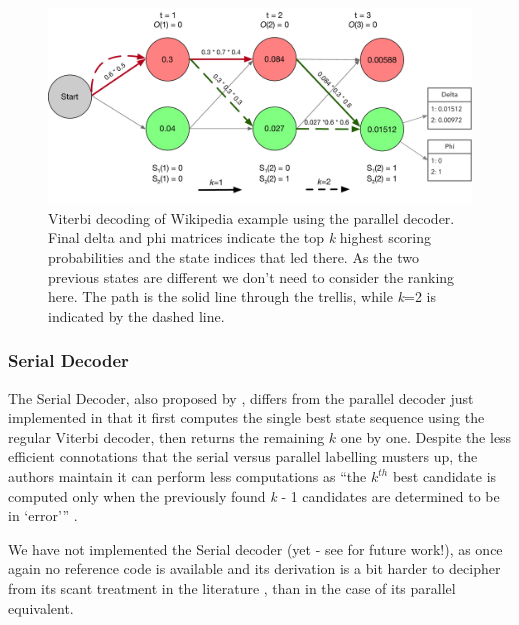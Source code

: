 {{{{{{{{\begin{figure}
	\begin{center}
		\includegraphics[width=1.0\textwidth]{ch05_pyconcat/figures/parallel_viterbi.pdf}
	\end{center}
	\caption[Parallel Viterbi decoding of Wikipedia example using our decoder]{Viterbi decoding of Wikipedia example using the parallel decoder. Final delta and phi matrices indicate the top \textit{k} highest scoring probabilities and the state indices that led there. As the two previous states are different we don't need to consider the ranking here. The path is the solid line through the trellis, while \textit{k}=2 is indicated by the dashed line.}
	\label{fig:viterbi_parallel}
\end{figure}

\subsubsection{Serial Decoder}

The Serial Decoder, also proposed by \cite{Seshadri1994}, differs from the parallel decoder just implemented in that it first computes the single best state sequence using the regular Viterbi decoder, then returns the remaining $k$ one by one. Despite the less efficient connotations that the serial versus parallel labelling musters up, the authors maintain it can perform less computations as ``the $k^{th}$ best candidate is computed only when the previously found \textit{k} - 1 candidates are determined to be in `error''' \citep{Seshadri1994}.

We have not implemented the Serial decoder (yet - see  for future work!), as once again no reference code is available and its derivation is a bit harder to decipher from its scant treatment in the literature \citep{Seshadri1994, Rabiner1993, Nill1995}, than in the case of its parallel equivalent.

}}}}}}}}
